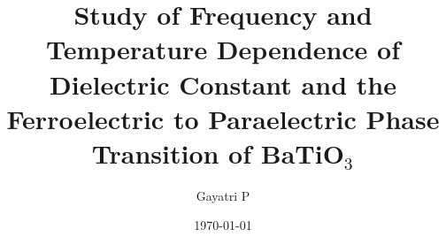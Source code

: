 \documentclass[reprint,amsmath,amssymb,aps, margin=1in]{revtex4-2}
\begin{document}
    \title{Study of Frequency and Temperature Dependence of Dielectric Constant and the Ferroelectric to Paraelectric Phase Transition of BaTiO$_3$}

    \author{Gayatri P}
    \date{\today}

    
    \maketitle

    
    
    

    
    \nocite{*}
\end{document}
